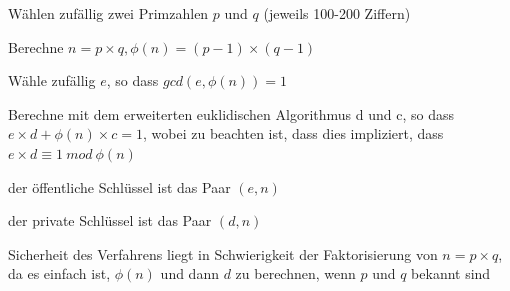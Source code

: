 \documentclass[a4paper]{article}
\begin{document}
\begin{multicols}{3}
\begin{itemize*}
            \begin{itemize*}
                  \item Wählen zufällig zwei Primzahlen $p$ und $q$ (jeweils 100-200 Ziffern)
                  \item Berechne $n=p\times q,\phi(n)=(p-1)\times (q-1)$
                  \item Wähle zufällig $e$, so dass $gcd(e,\phi(n))=1$
                  \item Berechne mit dem erweiterten euklidischen Algorithmus d und c, so dass $e\times d+\phi(n)\times c=1$, wobei zu beachten ist, dass dies impliziert, dass $e\times d\equiv 1\ mod\ \phi(n)$
                  \item der öffentliche Schlüssel ist das Paar $(e,n)$
                  \item der private Schlüssel ist das Paar $(d,n)$
            \end{itemize*}
            \item Sicherheit des Verfahrens liegt in Schwierigkeit der Faktorisierung von $n=p\times q$, da es einfach ist, $\phi(n)$ und dann $d$ zu berechnen, wenn $p$ und $q$ bekannt sind
      \end{itemize*}


\end{multicols}
\end{document}
